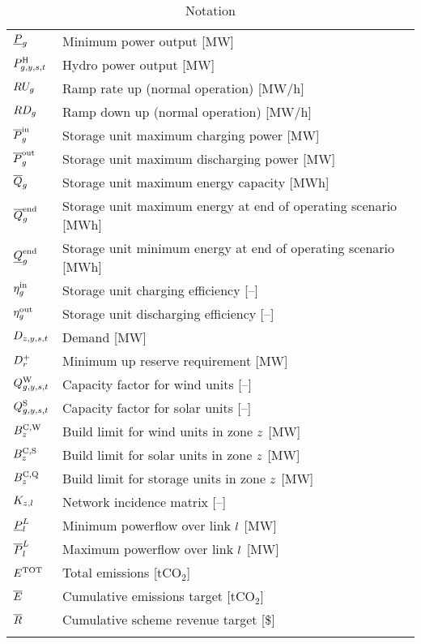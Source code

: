 \documentclass{article}
\begin{document}
\begin{longtable}{ p{}  p{}}
		$\underline{P}_{g}$ & Minimum power output [MW]\\
		$P^{\mathrm{H}}_{g,y,s,t}$ & Hydro power output [MW]\\
		$RU_{g}$ & Ramp rate up (normal operation) [MW/h]\\
		$RD_{g}$ & Ramp down up (normal operation) [MW/h]\\
		$\overline{P}^{\mathrm{in}}_{g}$ & Storage unit maximum charging power [MW]\\
		$\overline{P}^{\mathrm{out}}_{g}$ & Storage unit maximum discharging power [MW]\\
		$\overline{Q}_{g}$ & Storage unit maximum energy capacity [MWh]\\
		$\overline{Q}^{\mathrm{end}}_{g}$ & Storage unit maximum energy at end of operating scenario [MWh]\\
		$\underline{Q}^{\mathrm{end}}_{g}$ & Storage unit minimum energy at end of operating scenario [MWh]\\
		$\eta_{g}^{\mathrm{in}}$ & Storage unit charging efficiency [--]\\
		$\eta_{g}^{\mathrm{out}}$ & Storage unit discharging efficiency [--]\\
		$D_{z,y,s,t}$ & Demand [MW]\\
		$D^{+}_{r}$ & Minimum up reserve requirement [MW]\\
		$Q_{g,y,s,t}^{\mathrm{W}}$ & Capacity factor for wind units [--]\\
		$Q_{g,y,s,t}^{\mathrm{S}}$ & Capacity factor for solar units [--]\\
		$B^{\mathrm{C,\mathrm{W}}}_{z}$ & Build limit for wind units in zone $z$ [MW]\\
		$B^{\mathrm{C,\mathrm{S}}}_{z}$ & Build limit for solar units in zone $z$ [MW]\\
		$B^{\mathrm{C,\mathrm{Q}}}_{z}$ & Build limit for storage units in zone $z$ [MW]\\
		$K_{z,l}$ & Network incidence matrix [--]\\
		$\underline{P}_{l}^{L}$ & Minimum powerflow over link $l$ [MW]\\
		$\overline{P}_{l}^{L}$ & Maximum powerflow over link $l$ [MW]\\
		$E^{\mathrm{TOT}}$ & Total emissions [tCO$_{2}$]\\
		$\overline{E}$ & Cumulative emissions target [tCO$_{2}$]\\
		$\overline{R}$ & Cumulative scheme revenue target [\$]\\
		\hline
		\caption{Notation}
	\end{longtable}
\end{document}
